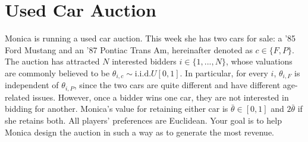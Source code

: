 \documentclass[a4paper]{article}
\begin{document}
\begin{enumerate}
	\end{enumerate}
	\fi
	
	
	
	
	\section{Used Car Auction}
	Monica is running a used car auction. This week she has two cars for sale: a '85 Ford Mustang and an '87 Pontiac Trans Am, hereinafter denoted as $c \in \{F,P\}$. The auction has attracted $N$ interested bidders $i\in \{1,...,N\}$, whose valuations are commonly believed to be $\theta_{i,c} \sim \text{i.i.d.}U[0,1]$. In particular, for every $i$, $\theta_{i,F}$ is independent of $\theta_{i,P}$, since the two cars are quite different and have different age-related issues. However, once a bidder wins one car, they are not interested in bidding for another. Monica's value for retaining either car is $\bar{\theta} \in [0,1]$ and $2\bar{\theta}$ if she retains both. All players' preferences are Euclidean. Your goal is to help Monica design the auction in such a way as to generate the most revenue.
	
\end{document}

